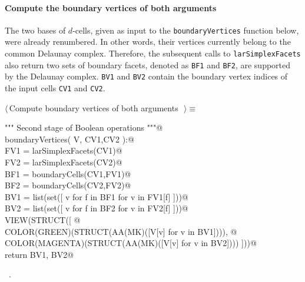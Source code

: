\documentclass[11pt,oneside]{article}	%
\begin{document}
\paragraph{Compute the boundary vertices of both arguments}
The two bases of $d$-cells, given as input to the \texttt{boundaryVertices} function below, were already renumbered. In other words, their vertices currently belong to the common Delaunay complex. Therefore, the subsequent calls to \texttt{larSimplexFacets} also return two sets of boundary facets, denoted as \texttt{BF1} and \texttt{BF2}, are supported by the Delaunay complex. \texttt{BV1} and \texttt{BV2} contain the boundary vertex indices of the input cells \texttt{CV1} and \texttt{CV2}.

\begin{flushleft} \small \label{scrap15}
$\langle\,$Compute boundary vertices of both arguments\nobreak\ {\footnotesize {}}$\,\rangle\equiv$
\vspace{-1ex}
\begin{list}{}{} \item
\mbox{}\verb@""" Second stage of Boolean operations """@\\
\mbox{}\verb@def boundaryVertices( V, CV1,CV2 ):@\\
\mbox{}\verb@   FV1 = larSimplexFacets(CV1)@\\
\mbox{}\verb@   FV2 = larSimplexFacets(CV2)@\\
\mbox{}\verb@   BF1 = boundaryCells(CV1,FV1)@\\
\mbox{}\verb@   BF2 = boundaryCells(CV2,FV2)@\\
\mbox{}\verb@   BV1 = list(set([ v for f in BF1 for v in FV1[f] ]))@\\
\mbox{}\verb@   BV2 = list(set([ v for f in BF2 for v in FV2[f] ]))@\\
\mbox{}\verb@   VIEW(STRUCT([ @\\
\mbox{}\verb@      COLOR(GREEN)(STRUCT(AA(MK)([V[v] for v in BV1]))), @\\
\mbox{}\verb@      COLOR(MAGENTA)(STRUCT(AA(MK)([V[v] for v in BV2]))) ]))@\\
\mbox{}\verb@   return BV1, BV2@\\
\mbox{}\verb@@{\NWsep}
\end{list}
\vspace{-1ex}
\footnotesize\addtolength{\baselineskip}{-1ex}
\begin{list}{}{\setlength{\itemsep}{-\parsep}\setlength{\itemindent}{-\leftmargin}}
\item \NWtxtMacroRefIn\ .
\end{list}
\end{flushleft}
\end{document}
